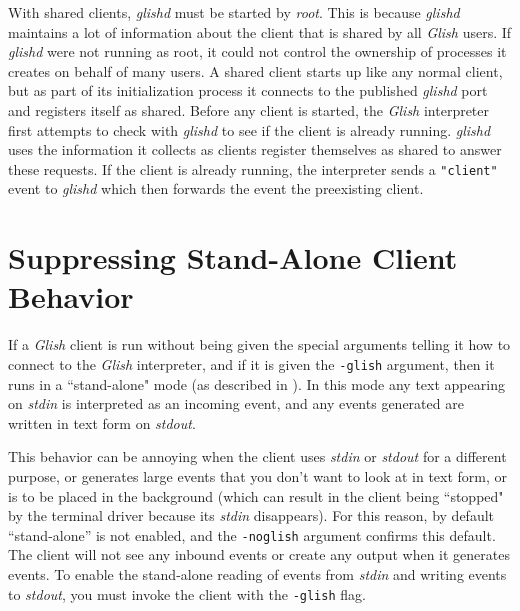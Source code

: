 \begin{sloppy}
\label{shared-client-implementation}
With shared clients, {\em glishd} must be started by {\em root}. This is
because {\em glishd} maintains a lot of information about the client that
is shared by all {\em Glish} users. If {\em glishd} were not running as root,
it could not control the ownership of processes it creates on behalf
of many users. A shared client starts up like any normal client, but as
part of its initialization process it connects to the published {\em glishd}
port and registers itself as shared. Before any client is started, the
{\em Glish} interpreter first attempts to check with {\em glishd} to see if the
client is already running.  {\em glishd} uses the information it collects
as clients register themselves as shared to answer these requests. If
the client is already running, the interpreter sends a \verb+"client"+ event
to {\em glishd} which then forwards the event the preexisting client.

\section{Suppressing Stand-Alone Client Behavior}
\label{suppressing-standalone}

If a {\em Glish} client is run without
being given the special arguments telling it how to connect to
the {\em Glish} interpreter, and if it is given the {\tt -glish} argument,
then it runs in a ``stand-alone" mode (as described 
in ).   
In this mode any text appearing on {\em stdin} is interpreted as an incoming
event, and any events generated are written in text form on {\em stdout\/}.

This behavior can be annoying when the client uses {\em stdin} or {\em stdout}
for a different purpose, or generates large events that you don't want to
look at in text form, or is to be placed in the background (which can
result in the client being ``stopped" by the terminal driver because
its {\em stdin} disappears).  For this reason,
by default ``stand-alone'' is not enabled, and the
{\tt -noglish} argument confirms this default.  The client will
not see any inbound events or create any output when it generates
events.  To enable the stand-alone reading of events from {\em stdin}
and writing events to {\em stdout}, you must invoke the client with the
{\tt -glish} flag.


\end{sloppy}

